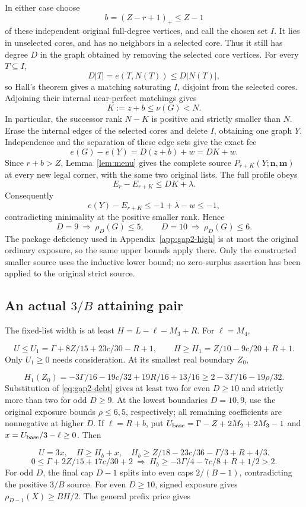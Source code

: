 \documentclass[11pt,a4paper]{article}
\newcommand{\nn}{\mathbf n}\newcommand{\mm}{\mathbf m}
\theoremstyle{definition}
\begin{document}
In either case choose
\[
 b=(Z-r+1)_+\le Z-1
\]
of these independent original full-degree vertices, and call the chosen
set \(I\).  It lies in unselected cores, and has no neighbors in a
selected core.  Thus it still has degree \(D\) in the graph obtained by
removing the selected core vertices.  For every \(T\subseteq I\),
\[
 D|T|=e(T,N(T))\le D|N(T)|,
\]
so Hall's theorem gives a matching saturating \(I\), disjoint from the
selected cores.  Adjoining their internal near-perfect matchings gives
\[
 K:=z+b\le\nu(G)<N.
\]
In particular, the successor rank \(N-K\) is positive and strictly
smaller than \(N\).  Erase the internal edges of the selected cores and
delete \(I\), obtaining one graph \(Y\).  Independence and the separation
of these edge sets give the exact fee
\[
 e(G)-e(Y)=D(z+b)+w=DK+w.
\]
Since \(r+b>Z\), Lemma~\ref{lem:menu} gives the complete source
\(P_{r+K}(Y;\nn,\mm)\) at every new legal corner, with the same two
original lists.  The full profile obeys
\[
 E_r-E_{r+K}\le DK+\lambda.
\]
Consequently
\[
 e(Y)-E_{r+K}
 \le -1+\lambda-w\le-1,
\]
contradicting minimality at the positive smaller rank.  Hence
\[
 D=9\ \Longrightarrow\ \rho_D(G)\le5,\qquad
 D=10\ \Longrightarrow\ \rho_D(G)\le6.
\]
The package deficiency used in Appendix~\ref{app:gap2-high} is at most
the original ordinary exposure, so the same upper bounds apply there.
Only the constructed smaller source uses the inductive lower bound;
no zero-surplus assertion has been applied to the original strict source.

\subsection{An actual $3/B$ attaining pair}
The fixed-list width is at least $H=L-\ell-M_3+R$.
For $\ell=M_4$,

\[
U\le U_1=\Gamma+8Z/15+23c/30-R+1,\qquad
H\ge H_1=Z/10-9c/20+R+1.
\]
Only $U_1\ge0$ needs consideration. At its smallest real boundary $Z_0$,

\[
H_1(Z_0)=-3\Gamma/16-19c/32+19R/16+13/16
\ge2-3\Gamma/16-19\rho/32.
\]
Substitution of \eqref{eq:gap2-debt} gives at least two for even $D\ge10$
and strictly more than two for odd $D\ge9$.
At the lowest boundaries $D=10,9$, use the original exposure bounds
$\rho\le6,5$, respectively; all remaining coefficients are nonnegative at higher $D$.
If $\ell=R+b$, put
$U_{\rm base}=\Gamma-Z+2M_2+2M_3-1$ and
$x=U_{\rm base}/3-\ell\ge0$. Then

\[
U=3x,\quad H\ge H_b+x,\quad
H_b\ge Z/18-23c/36-\Gamma/3+R+4/3.
\]
\[
0\le\Gamma+2Z/15+17c/30+2
\ \Longrightarrow\
H_b\ge-3\Gamma/4-7c/8+R+1/2>2.
\]
For odd $D$, the final cap $D-1$ splits into even caps $2/(B-1)$,
contradicting the positive $3/B$ source.
For even $D\ge10$, signed exposure gives $\rho_{D-1}(X)\ge BH/2$.
The general prefix price gives
\end{document}
